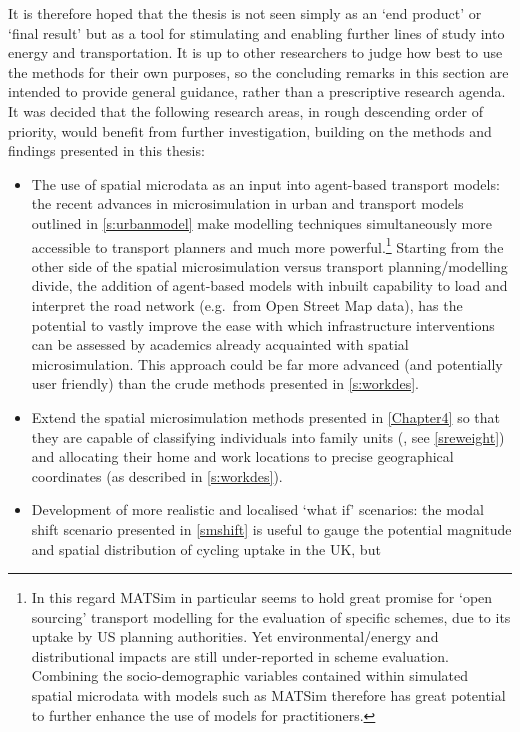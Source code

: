 It is therefore hoped that the thesis is not seen simply as an `end product' or `final
result' but as a tool for stimulating and enabling further lines of study into
energy and transportation. It is up to other researchers to
judge how best to use the methods for their own purposes, so the concluding
remarks in this section are intended to provide general guidance, rather than a
prescriptive research agenda. It was decided that the following research areas,
in rough descending order of priority, would benefit from further investigation,
building on the methods and findings presented in this thesis:
\begin{itemize}
 \item The use of spatial microdata as an input into agent-based
transport models: the recent advances in microsimulation in urban and transport
models outlined in \cref{s:urbanmodel} make modelling techniques simultaneously
more accessible to transport planners and much more
powerful.\footnote{In this
regard MATSim in particular
seems to hold great promise for `open sourcing' transport modelling for the
evaluation of specific schemes, due to its uptake by US planning authorities.
Yet environmental/energy and distributional impacts are still under-reported in
scheme evaluation. Combining the socio-demographic variables contained within
simulated spatial microdata with models such as MATSim therefore has great
potential to further enhance the use of models for practitioners.
}
Starting from
the other side of the spatial microsimulation versus transport
planning/modelling
divide, the addition of agent-based models with inbuilt capability to load and
interpret the road network (e.g.~from Open Street Map data), has the potential
to vastly improve the ease with which infrastructure interventions can be
assessed by academics already acquainted with spatial microsimulation. This
approach could be far more advanced (and potentially user
friendly) than the crude methods presented in \cref{s:workdes}.
\item Extend the spatial microsimulation methods presented in \cref{Chapter4} so
that they are capable of classifying individuals into family units
(\citealp{Pritchard2012}, see \cref{sreweight}) and allocating their home and
work locations to precise geographical coordinates (as described in
\cref{s:workdes}).
\item Development of more realistic and localised `what if' scenarios: 
the modal shift scenario presented in \cref{smshift} is useful to gauge the
potential magnitude and spatial distribution of cycling uptake in the UK, but

\end{itemize}
